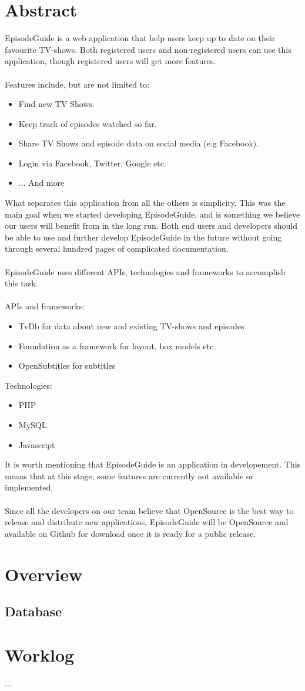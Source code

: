 \documentclass[12pt]{article}
\begin{document}


\tableofcontents

\section{Abstract}
EpisodeGuide is a web application that help users keep up to date on their favourite TV-shows. Both registered users and non-registered users can use this application, though registered users will get more features.
\\\\
Features include, but are not limited to:
\begin{itemize}
  \item Find new TV Shows.
  \item Keep track of episodes watched so far.
  \item Share TV Shows and episode data on social media (e.g Facebook).
  \item Login via Facebook, Twitter, Google etc.
  \item ... And more
\end{itemize}
What separates this application from all the others is simplicity. This was the main goal when we started developing EpisodeGuide, and is something we believe our users will benefit from in the long run.
Both end users and developers should be able to use and further develop EpisodeGuide in the future without going through several hundred pages of complicated documentation.
\\\\
EpisodeGuide uses different APIs, technologies and frameworks to accomplish this task.\\\\
APIs and frameworks:
\begin{itemize}
  \item TvDb for data about new and existing TV-shows and episodes
  \item Foundation as a framework for layout, box models etc.
  \item OpenSubtitles for subtitles
\end{itemize}
Technologies:
\begin{itemize}
  \item PHP
  \item MySQL
  \item Javascript
\end{itemize}
It is worth mentioning that EpisodeGuide is an application in developement. This means that at this stage, some features are currently not available or implemented.\\
\\
Since all the developers on our team believe that OpenSource is the best way to release and distribute new applications, EpisodeGuide will be OpenSource and available on Github for download once it is ready for a public release.
\section{Overview}
\subsection{Database}


\section{Worklog}


...
\end{document}
